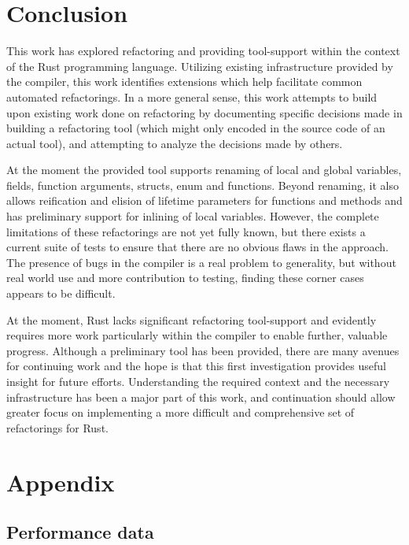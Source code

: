 \chapter{Conclusion}\label{C:con}
This work has explored refactoring and providing tool-support within the context of the Rust programming language. Utilizing existing infrastructure provided by the compiler, this work identifies extensions which help facilitate common automated refactorings. In a more general sense, this work attempts to build upon existing work done on refactoring by documenting specific decisions made in building a refactoring tool (which might only encoded in the source code of an actual tool), and attempting to analyze the decisions made by others.


At the moment the provided tool supports renaming of local and global variables, fields, function arguments, structs, enum and functions. Beyond renaming, it also allows reification and elision of lifetime parameters for functions and methods and has preliminary support for inlining of local variables. However, the complete limitations of these refactorings are not yet fully known, but there exists a current suite of tests to ensure that there are no obvious flaws in the approach. The presence of bugs in the compiler is a real problem to generality, but without real world use and more contribution to testing, finding these corner cases appears to be difficult.

At the moment, Rust lacks significant refactoring tool-support and evidently requires more work particularly within the compiler to enable further, valuable progress. Although a preliminary tool has been provided, there are many avenues for continuing work and the hope is that this first investigation provides useful insight for future efforts. Understanding the required context and the necessary infrastructure has been a major part of this work, and continuation should allow greater focus on implementing a more difficult and comprehensive set of refactorings for Rust.

\chapter{Appendix}\label{C:appen}
\section{Performance data}

